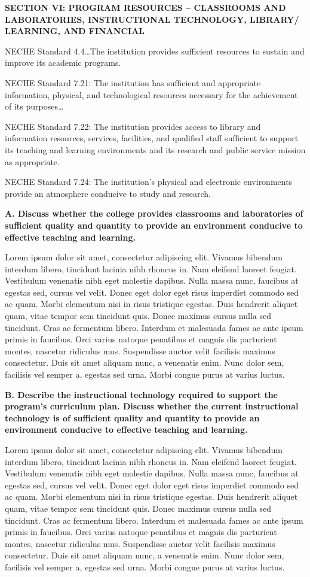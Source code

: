\textbf{SECTION VI: PROGRAM RESOURCES – CLASSROOMS AND LABORATORIES, INSTRUCTIONAL TECHNOLOGY, LIBRARY/ LEARNING, AND FINANCIAL}

NECHE Standard 4.4…The institution provides sufficient resources to sustain and improve its academic programs.

NECHE Standard 7.21: The institution has sufficient and appropriate information, physical, and technological resources necessary for the achievement of its purposes…

NECHE Standard 7.22: The institution provides access to library and information resources, services, facilities, and qualified staff sufficient to support its teaching and learning environments and its research and public service mission as appropriate.

NECHE Standard 7.24: The institution’s physical and electronic environments provide an atmosphere conducive to study and research.


\textbf{A. Discuss whether the college provides classrooms and laboratories of sufficient quality and quantity to provide an environment conducive to effective teaching and learning.}

Lorem ipsum dolor sit amet, consectetur adipiscing elit. Vivamus bibendum interdum libero, tincidunt lacinia nibh rhoncus in. Nam eleifend laoreet feugiat. Vestibulum venenatis nibh eget molestie dapibus. Nulla massa nunc, faucibus at egestas sed, cursus vel velit. Donec eget dolor eget risus imperdiet commodo sed ac quam. Morbi elementum nisi in risus tristique egestas. Duis hendrerit aliquet quam, vitae tempor sem tincidunt quis. Donec maximus cursus nulla sed tincidunt. Cras ac fermentum libero. Interdum et malesuada fames ac ante ipsum primis in faucibus. Orci varius natoque penatibus et magnis dis parturient montes, nascetur ridiculus mus. Suspendisse auctor velit facilisis maximus consectetur. Duis sit amet aliquam nunc, a venenatis enim. Nunc dolor sem, facilisis vel semper a, egestas sed urna. Morbi congue purus at varius luctus. 

\textbf{B. Describe the instructional technology required to support the program’s curriculum plan. Discuss whether the current instructional technology is of sufficient quality and quantity to provide an environment conducive to effective teaching and learning.}

Lorem ipsum dolor sit amet, consectetur adipiscing elit. Vivamus bibendum interdum libero, tincidunt lacinia nibh rhoncus in. Nam eleifend laoreet feugiat. Vestibulum venenatis nibh eget molestie dapibus. Nulla massa nunc, faucibus at egestas sed, cursus vel velit. Donec eget dolor eget risus imperdiet commodo sed ac quam. Morbi elementum nisi in risus tristique egestas. Duis hendrerit aliquet quam, vitae tempor sem tincidunt quis. Donec maximus cursus nulla sed tincidunt. Cras ac fermentum libero. Interdum et malesuada fames ac ante ipsum primis in faucibus. Orci varius natoque penatibus et magnis dis parturient montes, nascetur ridiculus mus. Suspendisse auctor velit facilisis maximus consectetur. Duis sit amet aliquam nunc, a venenatis enim. Nunc dolor sem, facilisis vel semper a, egestas sed urna. Morbi congue purus at varius luctus. 


